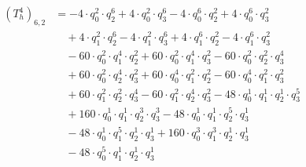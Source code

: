 \begin{align*}(T_{h}^4)_{6,2}&=-4\cdot q_0^{2}\cdot q_2^{6}+4\cdot q_0^{2}\cdot q_3^{6}-4\cdot q_0^{6}\cdot q_2^{2}+4\cdot q_0^{6}\cdot q_3^{2}\\
&\quad +4\cdot q_1^{2}\cdot q_2^{6}-4\cdot q_1^{2}\cdot q_3^{6}+4\cdot q_1^{6}\cdot q_2^{2}-4\cdot q_1^{6}\cdot q_3^{2}\\
&\quad -60\cdot q_0^{2}\cdot q_1^{4}\cdot q_2^{2}+60\cdot q_0^{2}\cdot q_1^{4}\cdot q_3^{2}-60\cdot q_0^{2}\cdot q_2^{2}\cdot q_3^{4}\\
&\quad +60\cdot q_0^{2}\cdot q_2^{4}\cdot q_3^{2}+60\cdot q_0^{4}\cdot q_1^{2}\cdot q_2^{2}-60\cdot q_0^{4}\cdot q_1^{2}\cdot q_3^{2}\\
&\quad +60\cdot q_1^{2}\cdot q_2^{2}\cdot q_3^{4}-60\cdot q_1^{2}\cdot q_2^{4}\cdot q_3^{2}-48\cdot q_0^{1}\cdot q_1^{1}\cdot q_2^{1}\cdot q_3^{5}\\
&\quad +160\cdot q_0^{1}\cdot q_1^{1}\cdot q_2^{3}\cdot q_3^{3}-48\cdot q_0^{1}\cdot q_1^{1}\cdot q_2^{5}\cdot q_3^{1}\\
&\quad -48\cdot q_0^{1}\cdot q_1^{5}\cdot q_2^{1}\cdot q_3^{1}+160\cdot q_0^{3}\cdot q_1^{3}\cdot q_2^{1}\cdot q_3^{1}\\
&\quad -48\cdot q_0^{5}\cdot q_1^{1}\cdot q_2^{1}\cdot q_3^{1}\end{align*}
